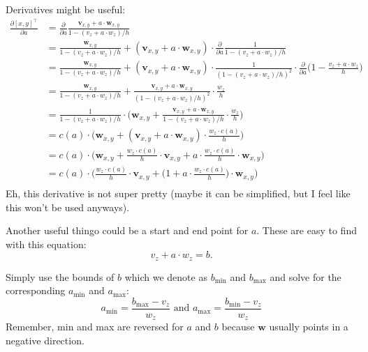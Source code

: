 \documentclass{article}
\renewcommand{\vec}{\mathbf}
\renewcommand{\d}{\partial}
\renewcommand{\min}{\mathrm{min}}
\renewcommand{\max}{\mathrm{max}}
\begin{document}
Derivatives might be useful:
\begin{align*}
    \frac{\d [x, y]^\top}{\d a} &= \frac{\d}{\d a} \frac{\vec{v}_{x,y} + a \cdot \vec{w}_{x,y}}{1 - (v_z + a \cdot w_z)/h} \\
    &= \frac{\vec{w}_{x,y}}{1 - (v_z + a \cdot w_z)/h} + (\vec{v}_{x,y} + a \cdot \vec{w}_{x,y}) \cdot \frac{\d}{\d a} \frac{1}{1 - (v_z + a \cdot w_z)/h} \\
    &= \frac{\vec{w}_{x,y}}{1 - (v_z + a \cdot w_z)/h} + (\vec{v}_{x,y} + a \cdot \vec{w}_{x,y}) \cdot \frac{1}{(1 - (v_z + a \cdot w_z)/h)^2} \cdot \frac{\d}{\d a} \Big(1 - \frac{v_z + a \cdot w_z}{h}\Big)\\
    &= \frac{\vec{w}_{x,y}}{1 - (v_z + a \cdot w_z)/h} + \frac{\vec{v}_{x,y} + a \cdot \vec{w}_{x,y}}{(1 - (v_z + a \cdot w_z)/h)^2} \cdot \frac{w_z}{h}\\
    &= \frac{1}{1 - (v_z + a \cdot w_z)/h} \cdot \Big( \vec{w}_{x,y} + \frac{\vec{v}_{x,y} + a \cdot \vec{w}_{x,y}}{1 - (v_z + a \cdot w_z)/h} \cdot \frac{w_z}{h} \Big)\\
    &= c(a) \cdot \Big( \vec{w}_{x,y} + (\vec{v}_{x,y} + a \cdot \vec{w}_{x,y}) \cdot \frac{w_z \cdot c(a)}{h} \Big)\\
    &= c(a) \cdot \Big( \vec{w}_{x,y} + \frac{w_z \cdot c(a)}{h} \cdot \vec{v}_{x,y} + a \cdot \frac{w_z \cdot c(a)}{h} \cdot \vec{w}_{x,y} \Big)\\
    &= c(a) \cdot \Big( \frac{w_z \cdot c(a)}{h} \cdot \vec{v}_{x,y} + \Big(1 + a \cdot \frac{w_z \cdot c(a)}{h} \Big) \cdot \vec{w}_{x,y} \Big)\\
\end{align*}
Eh, this derivative is not super pretty (maybe it can be simplified, but I feel like this won't be used anyways).

Another useful thingo could be a start and end point for $a$. These are easy to find with this equation:
$$ v_z + a \cdot w_z = b. $$

Simply use the bounds of $b$ which we denote as $b_\min$ and $b_\max$ and solve for the corresponding $a_\min$ and $a_\max$:
$$ a_\min = \frac{b_\max - v_z}{w_z} \text{ and } a_\max = \frac{b_\min - v_z}{w_z} $$
Remember, min and max are reversed for $a$ and $b$ because $\vec{w}$ usually points in a negative direction.
\end{document}

